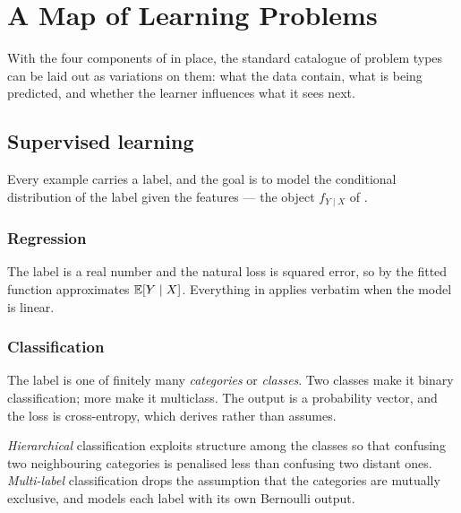 \setchapterpreamble[u]{\margintoc}
\chapter{A Map of Learning Problems}


With the four components of  in place, the standard
catalogue of problem types can be laid out as variations on them: what the data
contain, what is being predicted, and whether the learner influences what it
sees next.

\section{Supervised learning}

Every example carries a label, and the goal is to model the conditional
distribution of the label given the features --- the object \(f_{Y\mid X}\) of
.

\subsection{Regression}

The label is a real number and the natural loss is squared error, so by
 the fitted function approximates
\(\mathbb{E}[Y\mid X]\). Everything in  applies verbatim when the
model is linear.

\subsection{Classification}

The label is one of finitely many \emph{categories} or \emph{classes}. Two
classes make it binary classification; more make it multiclass. The output is a
probability vector, and the loss is cross-entropy, which
 derives rather than assumes.

\emph{Hierarchical} classification exploits structure among the classes so that
confusing two neighbouring categories is penalised less than confusing two
distant ones. \emph{Multi-label} classification drops the assumption that the
categories are mutually exclusive, and models each label with its own Bernoulli
output.


